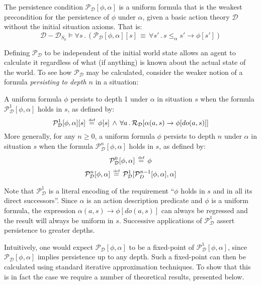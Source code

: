 \begin{defn}
The persistence condition $\mathcal{P}_{\mathcal{D}}[\phi,\alpha]$
is a uniform formula that is the weakest precondition for the persistence
of $\phi$ under $\alpha$, given a basic action theory $\mathcal{D}$
without the initial situation axioms. That is:\label{def:persistence-condition}\[
\mathcal{D}-\mathcal{D}_{S_{0}}\models\forall s\,.\,\left(\mathcal{P_{D}}[\phi,\alpha][s]\,\equiv\,\forall s'\,.\, s\leq_{\alpha}s'\rightarrow\phi[s']\right)\]

\end{defn}
Defining $\mathcal{P}_{\mathcal{D}}$ to be independent of the initial
world state allows an agent to calculate it regardless of what (if
anything) is known about the actual state of the world. To see how
$\mathcal{P}_{\mathcal{D}}$ may be calculated, consider the weaker
notion of a formula \emph{persisting to depth $n$} in a situation:

\begin{defn}
A uniform formula $\phi$ persists to depth 1 under $\alpha$ in situation
$s$ when the formula $\mathcal{P}_{\mathcal{D}}^{1}[\phi,\alpha]$
holds in $s$, as defined by:\label{def:persists-depth-n}\[
\mathcal{P}_{\mathcal{D}}^{1}[\phi,\alpha][s]\,\stackrel{\mbox{\tiny def}}{=}\,\phi[s]\,\wedge\,\forall a\,.\,\mathcal{R_{D}}[\alpha(a,s)\rightarrow\phi[do(a,s)]]\]
 More generally, for any $n\geq0$, a uniform formula $\phi$ persists
to depth $n$ under $\alpha$ in situation $s$ when the formula $\mathcal{P}_{\mathcal{D}}^{n}[\phi,\alpha]$
holds in $s$, as defined by:\[
\mathcal{P}_{\mathcal{D}}^{0}[\phi,\alpha]\,\stackrel{\mbox{\tiny def}}{=}\,\phi\]
 \[
\mathcal{P}_{\mathcal{D}}^{n}[\phi,\alpha]\,\stackrel{\mbox{\tiny def}}{=}\,\mathcal{P}_{\mathcal{D}}^{1}[\mathcal{P}_{D}^{n-1}[\phi,\alpha],\alpha]\]

\end{defn}
Note that $\mathcal{P}_{\mathcal{D}}^{1}$ is a literal encoding of
the requirement {}``$\phi$ holds in $s$ and in all its direct successors''.
Since $\alpha$ is an action description predicate and $\phi$ is
a uniform formula, the expression $\alpha(a,s)\rightarrow\phi[do(a,s)]$
can always be regressed and the result will always be uniform in $s$.
Successive applications of $\mathcal{P}_{\mathcal{D}}^{1}$ assert
persistence to greater depths.

Intuitively, one would expect $\mathcal{P}_{\mathcal{D}}[\phi,\alpha]$
to be a fixed-point of $\mathcal{P}_{\mathcal{D}}^{1}[\phi,\alpha]$,
since $\mathcal{P}_{\mathcal{D}}[\phi,\alpha]$ implies persistence
up to any depth. Such a fixed-point can then be calculated using standard
iterative approximation techniques. To show that this is in fact the
case we require a number of theoretical results, presented below.


